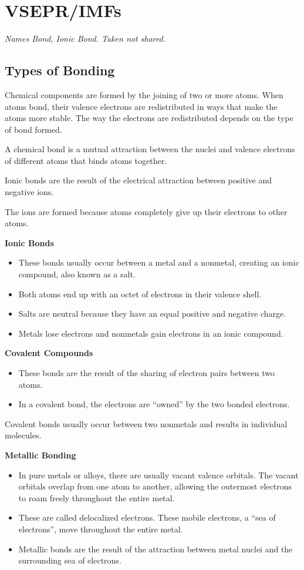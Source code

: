 \documentclass[../hchem.tex]{subfiles}
\begin{document}
\chapter{VSEPR/IMFs}
\textit{Names Bond, Ionic Bond. Taken not shared.}

\section{Types of Bonding}
Chemical components are formed by the joining of two or more atoms. When atoms bond, their 
valence electrons are redistributed in ways that make the atoms more stable. The way the electrons are redistributed depends on the type of bond formed.

A chemical bond is a mutual attraction between the nuclei and valence electrons of different atoms that binds atoms together.

Ionic bonds are the result of the electrical attraction between positive and negative ions.

The ions are formed because atoms completely give up their electrons to other atoms.

\textbf{Ionic Bonds}
\begin{itemize}
    \item These bonds usually occur between a metal and a nonmetal, creating an ionic compound, also known as a salt.
    \item Both atoms end up with an octet of electrons in their valence shell.
    \item Salts are neutral because they have an equal positive and negative charge.
    \item Metals lose electrons and nonmetals gain electrons in an ionic compound.
\end{itemize}

\textbf{Covalent Compounds}
\begin{itemize}
    \item These bonds are the result of the sharing of electron pairs between two atoms.
    \item In a covalent bond, the electrons are ``owned'' by the two bonded electrons.
\end{itemize}

Covalent bonds usually occur between two nonmetals and results in individual molecules.

\textbf{Metallic Bonding}
\begin{itemize}
    \item In pure metals or alloys, there are usually vacant valence orbitals. The vacant orbitals overlap from one atom to another, allowing the outermost electrons to roam freely throughout the entire metal.
    \item These are called delocalized electrons. These mobile electrons, a ``sea of electrons'', move throughout the entire metal.
    \item Metallic bonds are the result of the attraction between metal nuclei and the surrounding sea of electrons.
\end{itemize}
\end{document}

